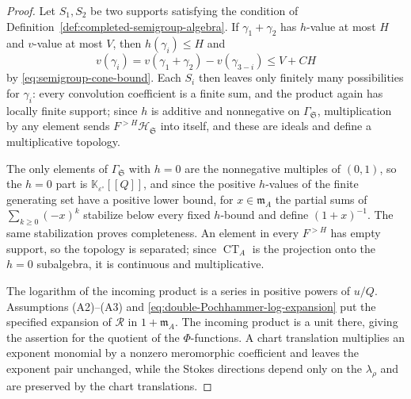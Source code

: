 \documentclass{amsart}
\theoremstyle{definition}
\numberwithin{equation}{section}
\newcommand{\K}{\mathbb K}
\newcommand{\eps}{\varepsilon}
\begin{document}
\begin{proof}
Let \(S_1,S_2\) be two supports satisfying the condition of Definition~\ref{def:completed-semigroup-algebra}.  If \(\gamma_1+\gamma_2\) has \(h\)-value at most \(H\) and \(v\)-value at most \(V\), then \(h(\gamma_i)\leq H\) and
\[
 v(\gamma_i)
 =v(\gamma_1+\gamma_2)-v(\gamma_{3-i})
 \leq V+CH
\]
by \eqref{eq:semigroup-cone-bound}.  Each \(S_i\) then leaves only finitely many possibilities for \(\gamma_i\): every convolution coefficient is a finite sum, and the product again has locally finite support; since \(h\) is additive and nonnegative on \(\Gamma_{\mathfrak S}\), multiplication by any element sends \(F^{>H}\mathscr H_{\mathfrak S}\) into itself, and these are ideals and define a multiplicative topology.

The only elements of \(\Gamma_{\mathfrak S}\) with \(h=0\) are the nonnegative multiples of \((0,1)\), so the \(h=0\) part is \(\K_{\eps^\circ}[[Q]]\), and since the positive \(h\)-values of the finite generating set have a positive lower bound, for \(x\in\mathfrak m_A\) the partial sums of \(\sum_{k\geq0}(-x)^k\) stabilize below every fixed \(h\)-bound and define \((1+x)^{-1}\).  The same stabilization proves completeness.  An element in every \(F^{>H}\) has empty support, so the topology is separated; since \(\operatorname{CT}_A\) is the projection onto the \(h=0\) subalgebra, it is continuous and multiplicative.

The logarithm of the incoming product is a series in positive powers of \(u/Q\).  Assumptions (A2)--(A3) and \eqref{eq:double-Pochhammer-log-expansion} put the specified expansion of \(\mathcal R\) in \(1+\mathfrak m_A\).  The incoming product is a unit there, giving the assertion for the quotient of the \(\Phi\)-functions.  A chart translation multiplies an exponent monomial by a nonzero meromorphic coefficient and leaves the exponent pair unchanged, while the Stokes directions depend only on the \(\lambda_\rho\) and are preserved by the chart translations.
\end{proof}
\end{document}
